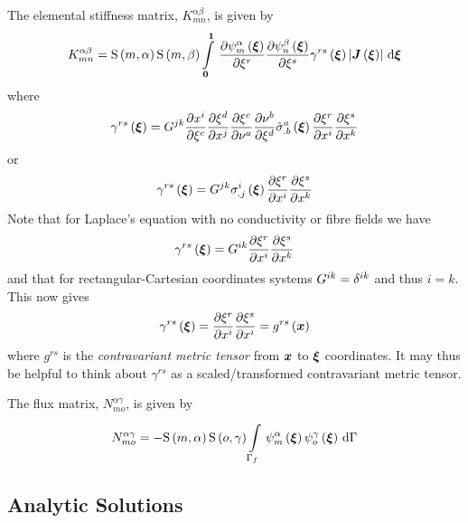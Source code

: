 The elemental stiffness matrix, $K^{\alpha\beta}_{mn}$, is given by
\begin{equation}
  K^{\alpha\beta}_{mn}=\gsf{m}{\alpha}\gsf{m}{\beta}
  \gint{\vectr{0}}{\vectr{1}}{\delby{\gbfn{m}{\alpha}{\vectr{\xi}}}{\xi^{r}}
    \delby{\gbfn{n}{\beta}{\vectr{\xi}}}{\xi^{s}}\fnof{\gamma^{rs}}{\vectr{\xi}}
    \abs{\fnof{\matr{J}}{\vectr{\xi}}}}{\vectr{\xi}}
  \label{eqn:elementalfemlhs2}
\end{equation}
where
\begin{equation}
  \fnof{\gamma^{rs}}{\vectr{\xi}}=G^{jk}\delby{x^{i}}{\xi^{c}}
  \delby{\xi^{d}}{x^{j}}\delby{\xi^{c}}{\nu^{a}}\delby{\nu^{b}}{\xi^{d}}
  \fnof{{\tilde{\sigma}}^{a}_{.b}}{\vectr{\xi}}\delby{\xi^{r}}{x^{i}}\delby{\xi^{s}}{x^{k}}
  \label{eqn:diffusiongammadefinition1}
\end{equation}
or
\begin{equation}
   \gamma^{rs}\left(  \boldsymbol{\xi}  \right) =G^{jk} {\sigma}^{i}_{.j}\left(  \boldsymbol{\xi}  \right)  \dfrac{\partial \xi^{r}}{\partial x^{i}}  \dfrac{\partial \xi^{s}}{\partial x^{k}} 
\end{equation}
Note that for Laplace's equation with no conductivity or fibre fields we have
\begin{equation}
  \fnof{\gamma^{rs}}{\vectr{\xi}}=G^{ik}\delby{\xi^{r}}{x^{i}}\delby{\xi^{s}}{x^{k}}
  \label{eqn:diffusiongammadefinition2}
\end{equation}
and that for rectangular-Cartesian coordinates systems
$G^{ik}=  \delta^{{i}{k}}  $ and thus $i=k$. This now gives
\begin{equation}
  \fnof{\gamma^{rs}}{\vectr{\xi}}=\delby{\xi^{r}}{x^{i}}\delby{\xi^{s}}{x^{i}}=\fnof{g^{rs}}{\vectr{x}}
  \label{eqn:diffusiongammadefinition3}
\end{equation}
where $g^{rs}$ is the \emph{contravariant metric tensor} from $ \boldsymbol{x} $ to
$ \boldsymbol{\xi} $ coordinates. It may thus be helpful to think about $\gamma^{rs}$
as a scaled/transformed contravariant metric tensor.

The flux matrix, $N^{\alpha\gamma}_{mo}$, is given by
\begin{equation}
  N^{\alpha\gamma}_{mo} = -\gsf{m}{\alpha}\gsf{o}{\gamma}
  \gint{\Gamma_{f}}{}{\gbfn{m}{\alpha}{\vectr{\xi}}\gbfn{o}{\gamma}{\vectr{\xi}}}{\Gamma}
\end{equation}

\subsection{Analytic Solutions}

